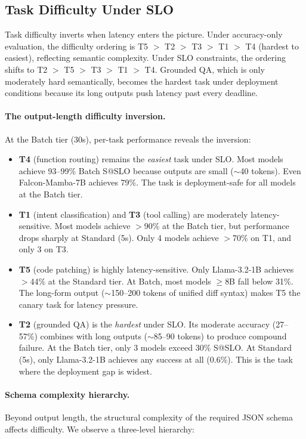 \documentclass[11pt]{article}
\begin{document}
\subsection{Task Difficulty Under SLO}

Task difficulty inverts when latency enters the picture.  Under accuracy-only evaluation, the difficulty ordering is T5 $>$ T2 $>$ T3 $>$ T1 $>$ T4 (hardest to easiest), reflecting semantic complexity.  Under SLO constraints, the ordering shifts to T2 $>$ T5 $>$ T3 $>$ T1 $>$ T4.  Grounded QA, which is only moderately hard semantically, becomes the hardest task under deployment conditions because its long outputs push latency past every deadline.

\paragraph{The output-length difficulty inversion.}
At the Batch tier (30s), per-task performance reveals the inversion:

\begin{itemize}[leftmargin=*]
\item \textbf{T4} (function routing) remains the \emph{easiest} task under SLO.  Most models achieve 93--99\% Batch S@SLO because outputs are small ($\sim$40 tokens).  Even Falcon-Mamba-7B achieves 79\%.  The task is deployment-safe for all models at the Batch tier.
\item \textbf{T1} (intent classification) and \textbf{T3} (tool calling) are moderately latency-sensitive.  Most models achieve $>$90\% at the Batch tier, but performance drops sharply at Standard (5s).  Only 4 models achieve $>$70\% on T1, and only 3 on T3.
\item \textbf{T5} (code patching) is highly latency-sensitive.  Only Llama-3.2-1B achieves $>$44\% at the Standard tier.  At Batch, most models $\geq$8B fall below 31\%.  The long-form output ($\sim$150--200 tokens of unified diff syntax) makes T5 the canary task for latency pressure.
\item \textbf{T2} (grounded QA) is the \emph{hardest} under SLO.  Its moderate accuracy (27--57\%) combines with long outputs ($\sim$85--90 tokens) to produce compound failure.  At the Batch tier, only 3 models exceed 30\% S@SLO.  At Standard (5s), only Llama-3.2-1B achieves any success at all (0.6\%).  This is the task where the deployment gap is widest.
\end{itemize}

\paragraph{Schema complexity hierarchy.}
Beyond output length, the structural complexity of the required JSON schema affects difficulty.  We observe a three-level hierarchy:
\end{document}
